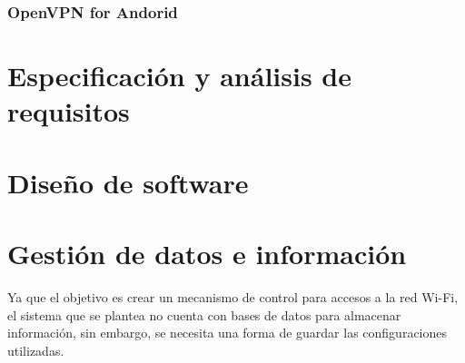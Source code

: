 \documentclass[12pt]{article}
\begin{document}
        \subsubsection{OpenVPN for Andorid}


\section{Especificación y análisis de requisitos}

\section{Diseño de software}

\section{Gestión de datos e información}
    Ya que el objetivo es crear un mecanismo de control para accesos a la red Wi-Fi, el sistema que se plantea no cuenta con bases de datos para almacenar información, sin embargo, se necesita una forma de guardar las configuraciones utilizadas.
    
\end{document}

